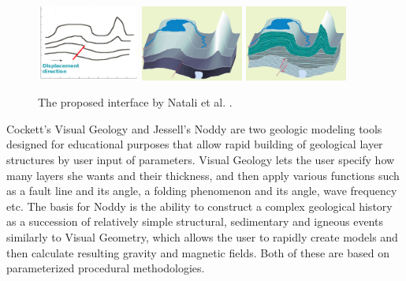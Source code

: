 \documentclass[a4paper,12pt]{report}
\begin{document}
\begin{figure}
 
 \centering
    \includegraphics[width=0.3\textwidth]{thesis/related/natali1.png}
    \includegraphics[width=0.3\textwidth]{thesis/related/natali2.png}
    \includegraphics[width=0.3\textwidth]{thesis/related/natali3.png}
  \caption{The proposed interface by Natali et al. \cite{natalirapid}.  }
  \label{fig:nataliRapid}
\end{figure}


Cockett's Visual Geology \cite{Cockett:Online} and Jessell's Noddy \cite{jessell1981noddy} are two geologic modeling tools designed for educational purposes that allow rapid building of geological layer structures by user input of parameters. Visual Geology lets the user specify how many layers she wants and their thickness, and then apply various functions such as a fault line and its angle, a folding phenomenon and its angle, wave frequency etc. The basis for Noddy is the ability to construct a complex geological history as a succession of relatively simple structural, sedimentary and igneous events similarly to Visual Geometry, which allows the user to rapidly create models and then calculate resulting gravity and magnetic fields. Both of these are based on parameterized procedural methodologies.
\end{document}
